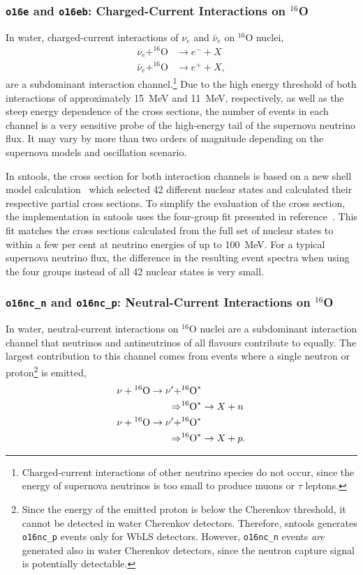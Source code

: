 \documentclass[11pt, oneside]{article}
\newcommand{\nue}{\ensuremath{\nu_e}\xspace}
\newcommand{\nuebar}{\ensuremath{\bar{\nu}_e}\xspace}
\begin{document}
\subsubsection{\texttt{o16e} and \texttt{o16eb}: Charged-Current Interactions on $^{16}$O}
In water, charged-current interactions of \nue and \nuebar on $^{16}$O nuclei,
\begin{align}
\nue + ^{16}\text{O} &\rightarrow e^- + X \\
\nuebar + ^{16}\text{O} &\rightarrow e^+ + X,
\end{align}
are a subdominant interaction channel.\footnote{\label{fn:cc-interactions}Charged-current interactions of other neutrino species do not occur, since the energy of supernova neutrinos is too small to produce muons or $\tau$ leptons.}
Due to the high energy threshold of both interactions of approximately \SI{15}{MeV} and \SI{11}{MeV}, respectively, as well as the steep energy dependence of the cross sections, the number of events in each channel is a very sensitive probe of the high-energy tail of the supernova neutrino flux.
It may vary by more than two orders of magnitude depending on the supernova models and oscillation scenario.

In sntools, the cross section for both interaction channels is based on a new shell model calculation~\cite{Suzuki2018} which selected 42 different nuclear states and calculated their respective partial cross sections.
To simplify the evaluation of the cross section, the implementation in sntools uses the four-group fit presented in reference~\cite{Nakazato2018}.
This fit matches the cross sections calculated from the full set of nuclear states to within a few per cent at neutrino energies of up to \SI{100}{MeV}.
For a typical supernova neutrino flux, the difference in the resulting event spectra when using the four groups instead of all 42 nuclear states is very small.


\subsubsection{\texttt{o16nc\_n} and \texttt{o16nc\_p}: Neutral-Current Interactions on $^{16}$O}
In water, neutral-current interactions on $^{16}$O nuclei are a subdominant interaction channel that neutrinos and antineutrinos of all flavours contribute to equally.
The largest contribution to this channel comes from events where a single neutron or proton\footnote{
	Since the energy of the emitted proton is below the Cherenkov threshold, it cannot be detected in water Cherenkov detectors.
	Therefore, sntools generates \texttt{o16nc\_p} events only for WbLS detectors.
	However, \texttt{o16nc\_n} events \textit{are} generated also in water Cherenkov detectors, since the neutron capture signal is potentially detectable.
} is emitted,
\begin{align}
\nu + \/^{16}\text{O} \rightarrow \nu' + &^{16}\text{O}^*\\
	\Rightarrow &^{16}\text{O}^{*} \rightarrow X + n\\
\nu + \/^{16}\text{O} \rightarrow \nu' + &^{16}\text{O}^*\\
	\Rightarrow &^{16}\text{O}^{*} \rightarrow X + p.
\end{align}
\end{document}
